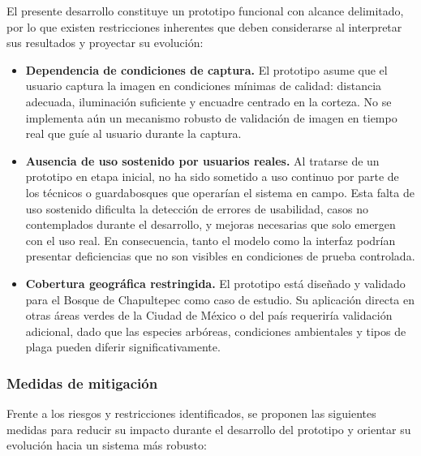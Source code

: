 El presente desarrollo constituye un prototipo funcional con alcance delimitado, por lo que existen restricciones inherentes que deben considerarse al interpretar sus resultados y proyectar su evolución:

\begin{itemize}

    \item \textbf{Dependencia de condiciones de captura.} El prototipo asume que el usuario captura la imagen en condiciones mínimas de calidad: distancia adecuada, iluminación suficiente y encuadre centrado en la corteza. No se implementa aún un mecanismo robusto de validación de imagen en tiempo real que guíe al usuario durante la captura.

    \item \textbf{Ausencia de uso sostenido por usuarios reales.} Al tratarse de un prototipo en etapa inicial, no ha sido sometido a uso continuo por parte de los técnicos o guardabosques que operarían el sistema en campo. Esta falta de uso sostenido dificulta la detección de errores de usabilidad, casos no contemplados durante el desarrollo, y mejoras necesarias que solo emergen con el uso real. En consecuencia, tanto el modelo como la interfaz podrían presentar deficiencias que no son visibles en condiciones de prueba controlada.


    \item \textbf{Cobertura geográfica restringida.} El prototipo está diseñado y validado para el Bosque de Chapultepec como caso de estudio. Su aplicación directa en otras áreas verdes de la Ciudad de México o del país requeriría validación adicional, dado que las especies arbóreas, condiciones ambientales y tipos de plaga pueden diferir significativamente.
\end{itemize}

\subsubsection{Medidas de mitigación}

Frente a los riesgos y restricciones identificados, se proponen las siguientes medidas para reducir su impacto durante el desarrollo del prototipo y orientar su evolución hacia un sistema más robusto:

